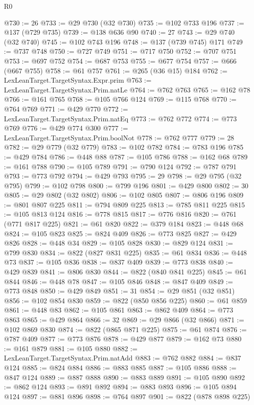 \begin{lexlean}{R0}
\begin{coremodule}
@730 := 26
@733 := @29 @730 (@32 @730)
@735 := @102 @733 @196
@737 := @137 (@729 @735)
@739 := @138 @636 @90
@740 := 27
@743 := @29 @740 (@32 @740)
@745 := @102 @743 @196
@748 := @137 (@739 @745) @171
@749 := @737 @748
@750 := @727 @749
@751 := @717 @750
@752 := @707 @751
@753 := @697 @752
@754 := @687 @753
@755 := @677 @754
@757 := @666 (@667 @755)
@758 := @61 @757
@761 := @265 (@36 @15) @184
@762 := LexLeanTarget.TargetSyntax.Expr.prim
@763 := LexLeanTarget.TargetSyntax.Prim.natLe
@764 := @762 @763
@765 := @162 @78
@766 := @161 @765
@768 := @105 @766 @124
@769 := @115 @768
@770 := @764 @769
@771 := @429 @770
@772 := LexLeanTarget.TargetSyntax.Prim.natEq
@773 := @762 @772
@774 := @773 @769
@776 := @429 @774 @300
@777 := LexLeanTarget.TargetSyntax.Prim.boolNot
@778 := @762 @777
@779 := 28
@782 := @29 @779 (@32 @779)
@783 := @102 @782
@784 := @783 @196
@785 := @429 @784
@786 := @448 @88
@787 := @105 @786
@788 := @162 @68
@789 := @161 @788
@790 := @105 @789
@791 := @790 @124
@792 := @787 @791
@793 := @773 @792
@794 := @429 @793
@795 := 29
@798 := @29 @795 (@32 @795)
@799 := @102 @798
@800 := @799 @196
@801 := @429 @800
@802 := 30
@805 := @29 @802 (@32 @802)
@806 := @102 @805
@807 := @806 @196
@809 := @801 @807 @225
@811 := @794 @809 @225
@813 := @785 @811 @225
@815 := @105 @813 @124
@816 := @778 @815
@817 := @776 @816
@820 := @761 (@771 @817 @225)
@821 := @61 @820
@822 := @379 @184
@823 := @448 @68
@824 := @105 @823
@825 := @824 @409
@826 := @773 @825
@827 := @429 @826
@828 := @448 @34
@829 := @105 @828
@830 := @829 @124
@831 := @799 @830
@834 := @822 (@827 @831 @225)
@835 := @61 @834
@836 := @448 @73
@837 := @105 @836
@838 := @837 @409
@839 := @773 @838
@840 := @429 @839
@841 := @806 @830
@844 := @822 (@840 @841 @225)
@845 := @61 @844
@846 := @448 @78
@847 := @105 @846
@848 := @847 @409
@849 := @773 @848
@850 := @429 @849
@851 := 31
@854 := @29 @851 (@32 @851)
@856 := @102 @854 @830
@859 := @822 (@850 @856 @225)
@860 := @61 @859
@861 := @448 @83
@862 := @105 @861
@863 := @862 @409
@864 := @773 @863
@865 := @429 @864
@866 := 32
@869 := @29 @866 (@32 @866)
@871 := @102 @869 @830
@874 := @822 (@865 @871 @225)
@875 := @61 @874
@876 := @787 @409
@877 := @773 @876
@878 := @429 @877
@879 := @162 @73
@880 := @161 @879
@881 := @105 @880
@882 := LexLeanTarget.TargetSyntax.Prim.natAdd
@883 := @762 @882
@884 := @837 @124
@885 := @824 @884
@886 := @883 @885
@887 := @105 @886
@888 := @847 @124
@889 := @887 @888
@890 := @883 @889
@891 := @105 @890
@892 := @862 @124
@893 := @891 @892
@894 := @883 @893
@896 := @105 @894 @124
@897 := @881 @896
@898 := @764 @897
@901 := @822 (@878 @898 @225)

\end{coremodule}
\end{lexlean}
